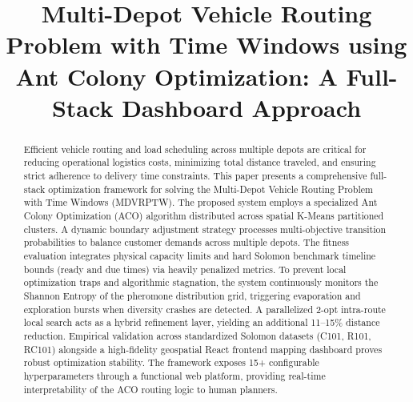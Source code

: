 \documentclass[10pt,conference]{IEEEtran}
\begin{document}
\title{Multi-Depot Vehicle Routing Problem with Time Windows using Ant Colony Optimization: A Full-Stack Dashboard Approach}

\author{
}

\maketitle

\begin{abstract}
Efficient vehicle routing and load scheduling across multiple depots are critical for reducing operational logistics costs, minimizing total distance traveled, and ensuring strict adherence to delivery time constraints. This paper presents a comprehensive full-stack optimization framework for solving the Multi-Depot Vehicle Routing Problem with Time Windows (MDVRPTW). The proposed system employs a specialized Ant Colony Optimization (ACO) algorithm distributed across spatial K-Means partitioned clusters. A dynamic boundary adjustment strategy processes multi-objective transition probabilities to balance customer demands across multiple depots. The fitness evaluation integrates physical capacity limits and hard Solomon benchmark timeline bounds (ready and due times) via heavily penalized metrics. To prevent local optimization traps and algorithmic stagnation, the system continuously monitors the Shannon Entropy of the pheromone distribution grid, triggering evaporation and exploration bursts when diversity crashes are detected. A parallelized 2-opt intra-route local search acts as a hybrid refinement layer, yielding an additional 11--15\% distance reduction. Empirical validation across standardized Solomon datasets (C101, R101, RC101) alongside a high-fidelity geospatial React frontend mapping dashboard proves robust optimization stability. The framework exposes 15+ configurable hyperparameters through a functional web platform, providing real-time interpretability of the ACO routing logic to human planners.
\end{abstract}
\end{document}
